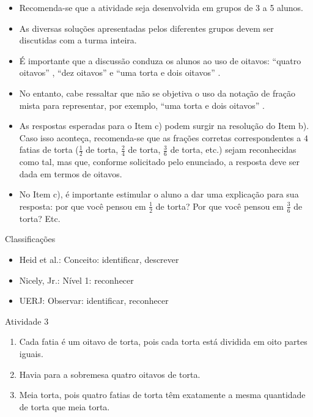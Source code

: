 \begin{multicols}{2}
\begin{itemize} %
    \item       Recomenda-se que a atividade seja desenvolvida em grupos de 3 a 5 alunos.
    \item       As diversas soluções apresentadas pelos diferentes grupos devem ser discutidas com a turma inteira.
    \item       É importante que a discussão conduza os alunos ao uso de oitavos:       ``quatro oitavos''      ,       ``dez oitavos''       e       ``uma torta e dois oitavos''      .
    \item       No entanto, cabe ressaltar que não se objetiva o uso da notação de fração mista para representar, por exemplo,       ``uma torta e dois oitavos''      .
    \item       As respostas esperadas para o Item c) podem surgir na resolução do Item b). Caso isso aconteça, recomenda-se que as frações corretas correspondentes a       $4$       fatias de torta ($\frac{1}{2}$       de torta,       $\frac{2}{4}$       de torta,       $\frac{3}{6}$       de torta, etc.) sejam reconhecidas como tal, mas que, conforme solicitado pelo enunciado, a resposta deve ser dada em termos de oitavos.
    \item       No Item c), é importante estimular o aluno a dar uma explicação para sua resposta: por que você pensou em       $\frac{1}{2}$       de torta? Por que você pensou em       $\frac{3}{6}$       de torta? Etc.
\end{itemize} %


  Classificações
\begin{itemize} %
    \item       Heid et al.: Conceito: identificar, descrever
    \item       Nicely, Jr.: Nível 1: reconhecer
    \item       UERJ: Observar: identificar, reconhecer
\end{itemize} %




\begin{resposta*}{Atividade 3}
\begin{enumerate} [\quad a)] %
    \item       Cada fatia é um oitavo de torta, pois cada torta está dividida em oito partes iguais.
    \item       Havia para a sobremesa quatro oitavos de torta.
    \item       Meia torta, pois quatro fatias de torta têm exatamente a mesma quantidade de torta que meia torta.
\end{enumerate} %
  

\end{resposta*}
\end{multicols}
